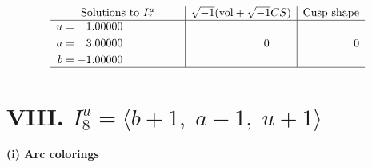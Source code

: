 \documentclass[1p]{elsarticle_modified}
\theoremstyle{definition}
\newcommand{\I}{\sqrt{-1}}
\begin{document}
$$\begin{array}{c|c|c}  
\text{Solutions to }I^u_{7}& \I (\text{vol} + \sqrt{-1}CS) & \text{Cusp shape}\\
 \hline 
\begin{aligned}
u &= \phantom{-}1.00000\phantom{ +0.000000I} \\
a &= \phantom{-}3.00000\phantom{ +0.000000I} \\
b &= -1.00000\phantom{ +0.000000I}\end{aligned}
 & \phantom{-0.000000 } 0 & \phantom{-0.000000 } 0\\
 \hline 
 \end{array}$$\newpage\newpage\renewcommand{\arraystretch}{1}
\centering \section*{VIII. $I^u_{8}= \langle b+1,\;a-1,\;u+1 \rangle$}
\flushleft \textbf{(i) Arc colorings}\\
\end{document}
